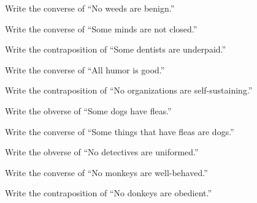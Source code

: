 \begin{exercises}
\item Write the converse of ``No weeds are benign.''

\item Write the converse of ``Some minds are not closed.''

\item Write the contraposition of ``Some dentists are underpaid.''

\item Write the converse of ``All humor is good.''

\item Write the contraposition of ``No organizations are self-sustaining.''

\item Write the obverse of ``Some dogs have fleas.''

\item Write the converse of ``Some things that have fleas are dogs.''

\item Write the obverse of ``No detectives are uniformed.''

\item Write the converse of ``No monkeys are well-behaved.''

\item Write the contraposition of ``No donkeys are obedient.''

\end{exercises}

